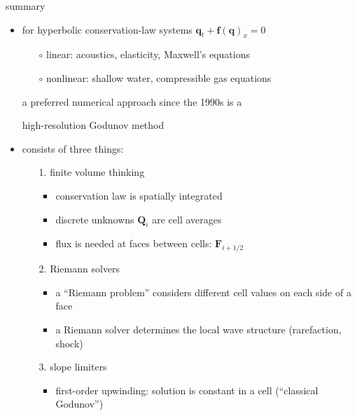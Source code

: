 \documentclass[10pt,hyperref,dvipsnames]{beamer}
\newcommand{\bbf}{\mathbf{f}}
\newcommand{\bq}{\mathbf{q}}
\newcommand{\bF}{\mathbf{F}}
\newcommand{\bQ}{\mathbf{Q}}
\begin{document}
\begin{frame}{summary}

\begin{itemize}
\item for hyperbolic conservation-law systems $\bq_t + \bbf(\bq)_x = 0$
    \begin{itemize}
    \item[$\circ$] linear: acoustics, elasticity, Maxwell's equations
    \item[$\circ$] nonlinear: shallow water, compressible gas equations
    \end{itemize}
a preferred numerical approach since the 1990s is a
\begin{center}
\alert{high-resolution Godunov method}
\end{center}
\item consists of three things:
    \begin{itemize}
    \item[\alert{1.}] \alert{finite volume thinking}
        \begin{itemize}
        \item conservation law is spatially integrated
        \item discrete unknowns $\bQ_i$ are cell averages
        \item flux is needed at faces between cells: $\bF_{i+1/2}$
        \end{itemize}
    \item[\alert{2.}] \alert{Riemann solvers}
        \begin{itemize}
        \item a ``Riemann problem'' considers different cell values on each side of a face
        \item a Riemann solver determines the local wave structure (rarefaction, shock)
        \end{itemize}
    \item[\alert{3.}] \alert{slope limiters}
        \begin{itemize}
        \item first-order upwinding: solution is constant in a cell (``classical Godunov'')

\end{itemize}
\end{itemize}
\end{itemize}
\end{frame}
\end{document}

